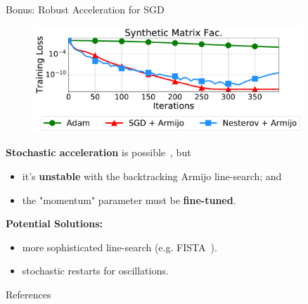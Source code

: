 \documentclass[notheorems]{beamer}
\begin{document}
    \begin{frame}{Bonus: Robust Acceleration for SGD}

        \begin{figure}[b]
            \centering
            \includegraphics[width=0.9\textwidth]{figures/matrix_fac}
        \end{figure}

        \textbf{Stochastic acceleration} is possible~\citep{vaswani2019fast, liu2020accelerating}, but
        \begin{itemize}
            \item it's \textbf{unstable} with the backtracking Armijo line-search; and
            \item the "momentum" parameter must be \textbf{fine-tuned}.\vspace{0.2em}
        \end{itemize}

        \textbf{Potential Solutions:}
        \begin{itemize}
            \item more sophisticated line-search (e.g. FISTA~\citep{DBLP:journals/siamis/BeckT09}).
            \item stochastic restarts for oscillations.
        \end{itemize}

    \end{frame}


    \begin{frame}[allowframebreaks]{References}
        
        
    \end{frame}
\end{document}
